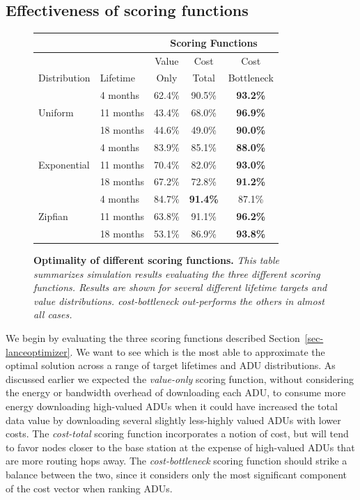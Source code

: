 \subsection{Effectiveness of scoring functions}
\label{sec-eval-heuristics}

\begin{figure}[t]
\begin{small}
\begin{center}
\begin{tabular}{|l|l|ccc|}
\hline
& & \multicolumn{3}{|c|}{Scoring Functions} \\ \hline
& & Value & Cost & Cost \\
Distribution & Lifetime & Only & Total & Bottleneck \\ \hline
\multirow{3}{*}{Uniform} & 4 months & 62.4\% & 90.5\% & \textbf{93.2\%} \\
& 11 months & 43.4\% & 68.0\% & \textbf{96.9\%} \\
& 18 months & 44.6\% & 49.0\% & \textbf{90.0\%} \\ \hline
\multirow{3}{*}{Exponential} & 4 months & 83.9\% & 85.1\% & \textbf{88.0\%}
\\
& 11 months & 70.4\% & 82.0\% & \textbf{93.0\%} \\
& 18 months & 67.2\% & 72.8\% & \textbf{91.2\%} \\ \hline
\multirow{3}{*}{Zipfian} & 4 months & 84.7\% & \textbf{91.4\%} & 87.1\% \\
& 11 months & 63.8\% & 91.1\% & \textbf{96.2\%} \\
& 18 months & 53.1\% & 86.9\% & \textbf{93.8\%} \\ \hline
\end{tabular}
\end{center}
\end{small}
\caption{\small {\bf Optimality of different scoring functions.} 
{\em This table summarizes simulation results evaluating the three 
different scoring functions.  Results are shown for
several different lifetime targets and value distributions. 
{\em cost-bottleneck} out-performs the others 
in almost all cases.}}
\label{sec-eval-table}
\end{figure}

We begin by evaluating the three scoring functions described
Section~\ref{sec-lanceoptimizer}.  We want to see which is the most able to
approximate the optimal solution across a range of target lifetimes
and ADU distributions. As discussed earlier we expected
the \emph{value-only} scoring function, without considering the energy or
bandwidth overhead of downloading each ADU, to consume more 
energy downloading
high-valued ADUs when it could have increased the total data value by
downloading several slightly less-highly valued ADUs with lower costs.  The
\emph{cost-total} scoring function incorporates a notion of cost, but
will tend to favor nodes closer to the base station at the expense
of high-valued ADUs that are more routing hops away. The
\emph{cost-bottleneck} scoring function should strike a balance between 
the two, since it considers only the most significant component 
of the cost vector when ranking ADUs.

